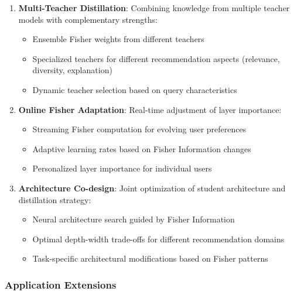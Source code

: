 \documentclass[10pt,conference]{IEEEtran}
\begin{document}
\begin{enumerate}[leftmargin=*]
    \item \textbf{Multi-Teacher Distillation}: Combining knowledge from multiple teacher models with complementary strengths:
    \begin{itemize}
        \item Ensemble Fisher weights from different teachers
        \item Specialized teachers for different recommendation aspects (relevance, diversity, explanation)
        \item Dynamic teacher selection based on query characteristics
    \end{itemize}
    
    \item \textbf{Online Fisher Adaptation}: Real-time adjustment of layer importance:
    \begin{itemize}
        \item Streaming Fisher computation for evolving user preferences
        \item Adaptive learning rates based on Fisher Information changes
        \item Personalized layer importance for individual users
    \end{itemize}
    
    \item \textbf{Architecture Co-design}: Joint optimization of student architecture and distillation strategy:
    \begin{itemize}
        \item Neural architecture search guided by Fisher Information
        \item Optimal depth-width trade-offs for different recommendation domains
        \item Task-specific architectural modifications based on Fisher patterns
    \end{itemize}
\end{enumerate}

\subsubsection{Application Extensions}
\end{document}
